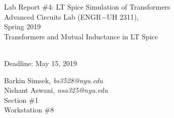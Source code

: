 \documentclass[journal]{IEEEtran}
\begin{document}
\begin{titlepage}
    {\centering
        \vspace*{20em}
        {
        \huge 
        \begin{spacing}{1.5}
            Lab Report \#4: LT Spice Simulation of Transformers
            \\
            Advanced Circuits Lab (ENGR$-$UH 2311),\\
            Spring 2019
            \bigskip
            \Large
            \\
            Transformers and Mutual Inductance in LT Spice
  
            \\
            \bigskip
            Deadline: May 15, 2019 
        \end{spacing}

        }
        
    }
    \vfill
    
    {
    \large
    
    \begin{spacing}{1.5}
    \noindent Barkin Simsek, {\it {bs3528@nyu.edu}} 
    \\
    Nishant Aswani, {\it {nsa325@nyu.edu}}
    \\
    Section \#1%
    \\
    Workstation \#8%
    \end{spacing}
    }


\end{titlepage}
{}
\setcounter{page}{1}




%
{}


\begin{abstract}
In this lab, the purpose was using the LTSpice software to build and simulate transformers while declaring the mutual inductance between the transformer coils. The voltage and current magnitudes & phase angles were determined by using LTSpice software. The average power dissipated in the load resistor or the second winding was also measured. Measured values were recorded in tables.

\end{abstract}
\end{document}
